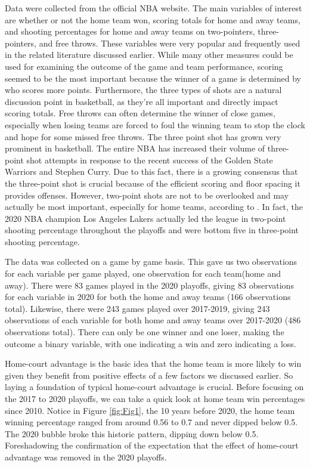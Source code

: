 \documentclass[10pt]{article}
\begin{document}
Data were collected from the official NBA website. The main variables of interest
are whether or not the home team won, scoring totals for home and away teams, and
shooting percentages for home and away teams on two-pointers, three-pointers, and
free throws. These variables were very popular and frequently used in the related
literature discussed earlier. While many other measures could be used for examining
the outcome of the game and team performance, scoring seemed to be the most
important because the winner of a game is determined by who scores more points. Furthermore, 
the three types of shots are a
natural discussion point in basketball, as they're all
important and directly impact scoring totals. Free throws can often determine the winner of close
games, especially when losing teams are forced to foul the winning team to
stop the clock and hope for some missed free throws. The three
point shot has grown very prominent in basketball. The entire NBA has increased their
volume of three-point shot attempts in response to the
recent success of the Golden State Warriors and Stephen Curry. Due to this
fact, there is a growing consensus that the three-point shot is crucial because of 
the efficient scoring and floor spacing it provides offenses. 
However, two-point shots are not to be overlooked and may
actually be most important, especially for home teams, according
to \citet{Harris}. In fact, the 2020 NBA champion Los Angeles Lakers actually led the 
league in two-point shooting percentage throughout the playoffs and were bottom five
in three-point shooting percentage.

The data was collected on a game by game basis. This gave us two observations
for each variable per game played, one observation for each team(home and away).
There were 83 games played in the 2020 playoffs, giving 83 observations
for each variable in 2020 for both the home and away teams (166 observations total).
Likewise, there were 243 games played over 2017-2019, giving 243 observations of each variable
for both home and away teams over 2017-2020 (486 observations total).
 There can only be
one winner and one loser, making the outcome a binary variable, with
one indicating a win and zero indicating a loss.

Home-court advantage is the basic idea that the home team is more likely to win given 
they benefit from positive effects of a few factors we discussed earlier.
So laying a foundation of typical home-court advantage is crucial. Before
focusing on the 2017 to 2020 playoffs, we can take a quick look at home team win
percentages since 2010. Notice in Figure \ref{fig:Fig1}, the 10 years before 2020, the home team
winning percentage ranged from around 0.56 to 0.7 and never dipped below 0.5. The
2020 bubble broke this historic pattern, dipping down below 0.5. Foreshadowing
the confirmation of the expectation that the effect of home-court advantage was removed
in the 2020 playoffs.
\end{document}
